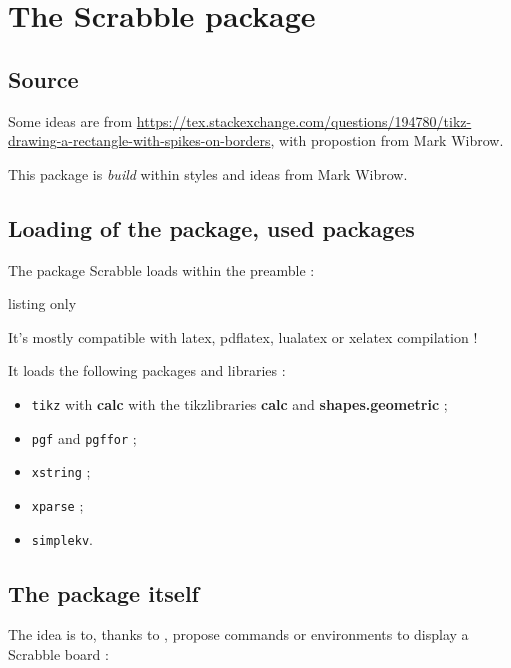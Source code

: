 \documentclass{article}
\newcommand\Cle[1]{{\bfseries\sffamily\textlangle #1\textrangle}}
\begin{document}
\section{The Scrabble package}

\subsection{Source}

Some ideas are from \url{https://tex.stackexchange.com/questions/194780/tikz-drawing-a-rectangle-with-spikes-on-borders}, with propostion from Mark Wibrow.

\smallskip

This package is \textit{build} within styles and ideas from Mark Wibrow.

\subsection{Loading of the package, used packages}

The package \textsf{Scrabble} loads within the preamble :

\begin{PresentationCode}{listing only}
\usepackage{Scrabble}
\end{PresentationCode}

It's mostly compatible with \textsf{latex}, \textsf{pdflatex}, \textsf{lualatex} or \textsf{xelatex} compilation !

\medskip

It loads the following packages and libraries :

\begin{itemize}
	\item \texttt{tikz} with \Cle{calc} with the tikzlibraries \Cle{calc} and \Cle{shapes.geometric} ;
	\item \texttt{pgf} and \texttt{pgffor} ;
	\item \texttt{xstring} ;
	\item \texttt{xparse} ;
	\item \texttt{simplekv}.
\end{itemize}

\subsection{The package itself}

The idea is to, thanks to \TikZ, propose commands or environments to display a Scrabble\texttrademark{} board :
\end{document}
